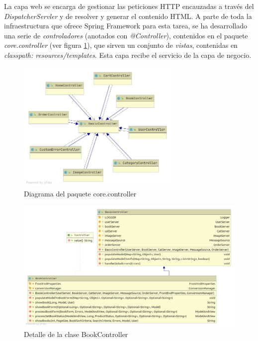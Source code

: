 \documentclass[a4paper]{article}
\begin{document}
    La capa web se encarga de gestionar las peticiones HTTP encauzadas a través del \emph{DispatcherServler} y de resolver y generar el contenido HTML. A parte de toda la infraestructura que ofrece Spring Framework para esta tarea, se ha desarrollado una serie de \emph{controladores} (anotados con \emph{@Controller}), contenidos en el paquete \emph{core.controller} (ver figura \ref{fig:package_controller}), que sirven un conjunto de \emph{vistas}, contenidas en \emph{classpath: resources/templates}. Esta capa recibe el servicio de la capa de negocio.
    	
   	\begin{figure}[htb!]
   		\centering
   		\includegraphics[width=0.7\textwidth,keepaspectratio]{package_controller}
   		\caption{Diagrama del paquete core.controller}
   		\label{fig:package_controller}
   	\end{figure}

   	\begin{figure}[htb!]
   		\centering
   		\includegraphics[width=\textwidth,keepaspectratio]{detail_bookController}
   		\caption{Detalle de la clase BookController}
   		\label{fig:detail_bookController}
   	\end{figure}
    	
\end{document}
